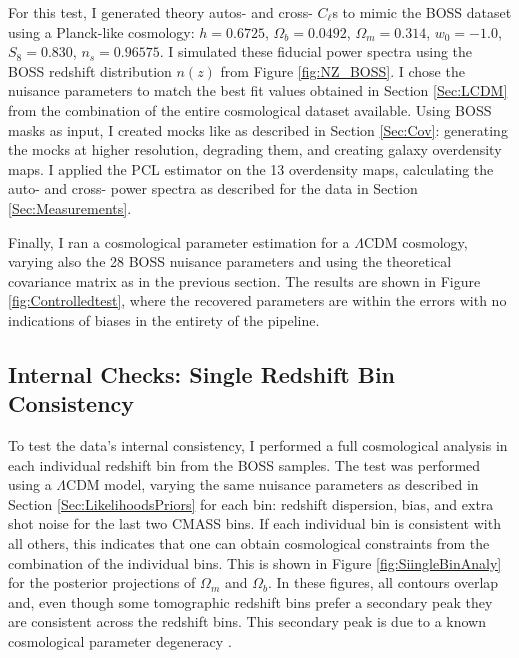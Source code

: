 For this test, I generated theory autos- and cross- $C_{\ell}$s to mimic the BOSS dataset using a Planck-like cosmology: $h = 0.6725$, $\Omega_b = 0.0492$, $\Omega_{m} = 0.314$, $w_0 = -1.0$, $S_8 = 0.830$, $n_s = 0.96575$. I simulated these fiducial power spectra using the BOSS redshift distribution $n(z)$ from Figure \ref{fig:NZ_BOSS}. I chose the nuisance parameters to match the best fit values obtained in Section \ref{Sec:LCDM} from the combination of the entire cosmological dataset available. Using BOSS masks as input, I created \flask mocks like as described in Section \ref{Sec:Cov}: generating the mocks at higher resolution, degrading them, and creating galaxy overdensity maps. I applied the PCL estimator on the 13 overdensity maps, calculating the auto- and cross- power spectra as described for the data in Section \ref{Sec:Measurements}.

\qquad Finally, I ran a cosmological parameter estimation for a $\Lambda$CDM cosmology, varying also the 28 BOSS nuisance parameters and using the theoretical covariance matrix as in the previous section. The results are shown in Figure \ref{fig:Controlledtest}, where the recovered parameters are within the errors with no indications of biases in the entirety of the pipeline. 

\subsection{Internal Checks: Single Redshift Bin Consistency}
To test the data's internal consistency, I performed a full cosmological analysis in each individual redshift bin from the BOSS samples. The test was performed using a $\Lambda$CDM model, varying the same nuisance parameters as described in Section \ref{Sec:LikelihoodsPriors} for each bin: redshift dispersion, bias, and extra shot noise for the last two CMASS bins. If each individual bin is consistent with all others, this indicates that one can obtain cosmological constraints from the combination of the individual bins. This is shown in Figure \ref{fig:SiingleBinAnaly} for the posterior projections of $\Omega_m$ and $\Omega_b$. In these figures, all contours overlap and, even though some tomographic redshift bins prefer a secondary peak they are consistent across the redshift bins. This secondary peak is due to a known cosmological parameter degeneracy \citep{2001Percival}.

